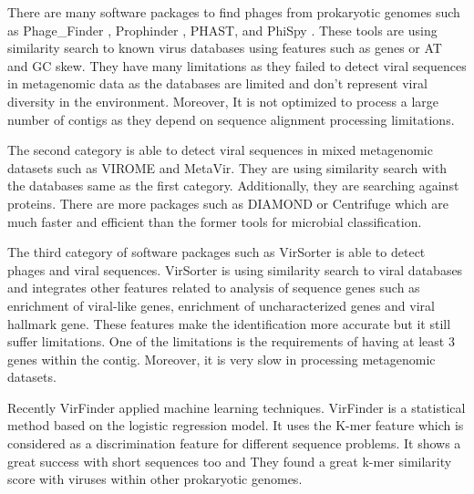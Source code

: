 \documentclass[conference]{IEEEtran}
\begin{document}
There are many software packages to find phages from prokaryotic genomes such as Phage\_Finder \cite{fouts2006phage_finder}, Prophinder \cite{lima2008prophinder}, PHAST\cite{zhou2011phast}, and PhiSpy \cite{akhter2012phispy}. These tools are using similarity search to known virus databases using features such as genes or AT and GC skew.%
They have many limitations as they failed to detect viral sequences in metagenomic data as the databases are %
limited and don't represent viral diversity in the environment. Moreover, It is not optimized to process a large number of contigs \cite{roux2015virsorter} as they depend on sequence alignment %
processing limitations. 

The second category is able to detect viral sequences in mixed metagenomic datasets such as VIROME \cite{wommack2012virome} and MetaVir\cite{roux2011metavir}. They are using similarity search with the databases same as the first category. Additionally, they are searching against proteins. There are more packages such as DIAMOND \cite{buchfink2014Diamond} or Centrifuge \cite{kim2016centrifuge} which are much faster and efficient than the former tools for microbial classification. %

The third category of software packages such as VirSorter \cite{roux2015virsorter} is able to detect phages and viral sequences. VirSorter is using similarity search to viral databases and integrates other features related to analysis of sequence genes such as enrichment of viral-like genes, enrichment of uncharacterized genes and viral hallmark gene. These features make the identification more accurate but it still suffer limitations. One of the limitations is the requirements of having at least 3 genes within the contig. %
Moreover, %
it is very slow in processing metagenomic datasets. 

Recently VirFinder \cite{ren2017virfinder} applied machine learning techniques. VirFinder is a statistical method based on the logistic regression model. It uses the K-mer feature which is considered as a discrimination feature for different sequence problems. It shows a great success with short sequences too and They found a great k-mer similarity score with viruses within other prokaryotic genomes. 
\end{document}
